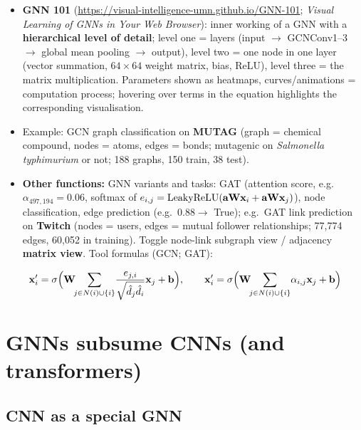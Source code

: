 \begin{itemize}
  \item \textbf{GNN 101} (\url{https://visual-intelligence-umn.github.io/GNN-101};
    \emph{Visual Learning of GNNs in Your Web Browser}): inner working of
    a GNN with a \textbf{hierarchical level of detail}; level one = layers
    (input $\to$ GCNConv1--3 $\to$ global mean pooling $\to$ output), level two
    = one node in one layer (vector summation, $64\times64$ weight matrix, bias,
    ReLU), level three = the matrix multiplication. Parameters shown as
    heatmaps, curves/animations = computation process; hovering over terms in
    the equation highlights the corresponding visualisation.
  \item Example: GCN graph classification on \textbf{MUTAG} (graph = chemical
    compound, nodes = atoms, edges = bonds; mutagenic on \emph{Salmonella
    typhimurium} or not; 188 graphs, 150 train, 38 test).
  \item \textbf{Other functions:} GNN variants and tasks: GAT (attention score,
    e.g.\ $\alpha_{497,194}=0.06$, softmax of
    $e_{i,j}=\mathrm{LeakyReLU}(\mathbf{a}\mathbf{W}\mathbf{x}_i+\mathbf{a}\mathbf{W}\mathbf{x}_j)$), node classification,
    edge prediction (e.g.\ $0.88\to$ True); e.g.\ GAT link prediction on
    \textbf{Twitch} (nodes = users, edges = mutual follower relationships;
    77{,}774 edges, 60{,}052 in training). Toggle node-link subgraph view /
    adjacency \textbf{matrix view}. Tool formulas (GCN; GAT):
\end{itemize}
\begin{equation*}
  \mathbf{x}_i'=\sigma\Bigl(\mathbf{W}\!\!\sum_{j\in N(i)\cup\{i\}}\!\frac{e_{j,i}}{\sqrt{\hat d_j\hat d_i}}\mathbf{x}_j+\mathbf{b}\Bigr),
  \qquad
  \mathbf{x}_i'=\sigma\Bigl(\mathbf{W}\!\!\sum_{j\in N(i)\cup\{i\}}\!\alpha_{i,j}\mathbf{x}_j+\mathbf{b}\Bigr)
\end{equation*}

\section{GNNs subsume CNNs (and transformers)}\label{sec:lec03-subsume}

\subsection{CNN as a special GNN}\label{sec:lec03-cnn}

